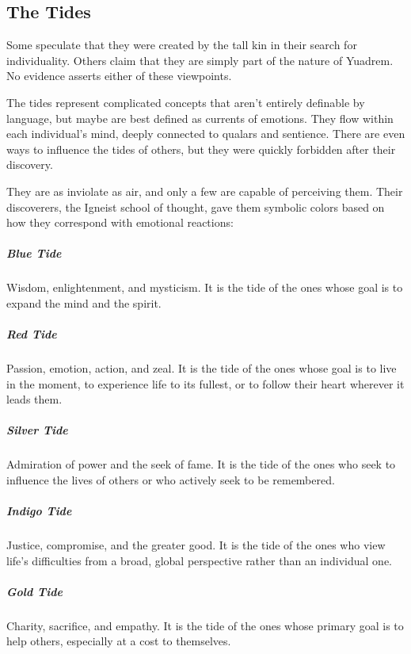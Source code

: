 


\subsection*{The Tides} \label{ssec::tides}
Some speculate that they were created by the tall kin in their search for individuality.
Others claim that they are simply part of the nature of Yuadrem.
No evidence asserts either of these viewpoints.

The tides represent complicated concepts that aren't entirely definable by language, but maybe are best defined as currents of emotions.
They flow within each individual's mind, deeply connected to qualars and sentience.
There are even ways to influence the tides of others, but they were quickly forbidden after their discovery.

They are as inviolate as air, and only a few are capable of perceiving them.
Their discoverers, the Igneist school of thought, gave them symbolic colors based on how they correspond with emotional reactions:

\subparagraph{Blue Tide} Wisdom, enlightenment, and mysticism.
It is the tide of the ones whose goal is to expand the mind and the spirit.

\subparagraph{Red Tide} Passion, emotion, action, and zeal.
It is the tide of the ones whose goal is to live in the moment, to experience life to its fullest, or to follow their heart wherever it leads them.

\subparagraph{Silver Tide} Admiration of power and the seek of fame.
It is the tide of the ones who seek to influence the lives of others or who actively seek to be remembered.

\subparagraph{Indigo Tide} Justice, compromise, and the greater good.
It is the tide of the ones who view life's difficulties from a broad, global perspective rather than an individual one.

\subparagraph{Gold Tide} Charity, sacrifice, and empathy.
It is the tide of the ones whose primary goal is to help others, especially at a cost to themselves.

